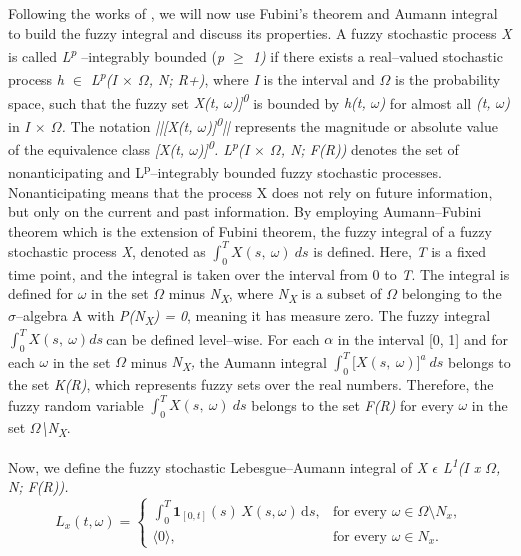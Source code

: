 \documentclass[12pt,a4paper]{report}
\numberwithin{equation}{section}
\begin{document}
Following the works of \cite{jafari2021fuzzy_81}, we will now use Fubini's theorem and
Aumann integral to build the fuzzy integral and discuss its properties.
A fuzzy stochastic process \emph{X} is called
\emph{L\textsuperscript{p}} --integrably bounded (\emph{p $\geq$ 1)} if there
exists a real--valued stochastic process \emph{h $\in$ L\textsuperscript{p}(I
$\times$ $\Omega$, N; R+)}, where \emph{I} is the interval and \emph{$\Omega$} is the
probability space, such that the fuzzy set \emph{\textbar\textbar{[}X(t,
$\omega$){]}\textsuperscript{0}}\textbar\textbar{} is bounded by \emph{h(t, $\omega$)}
for almost all \emph{(t, $\omega$)} in \emph{I $\times$ $\Omega$.} The notation
\emph{||{[}X(t, $\omega$){]}\textsuperscript{0}||} represents the magnitude or
absolute value of the equivalence class \emph{{[}X(t,
$\omega$){]}\textsuperscript{0}. L\textsuperscript{p}(I $\times$ $\Omega$, N; F(R))} denotes
the set of nonanticipating and L\textsuperscript{p}--integrably bounded
fuzzy stochastic processes. Nonanticipating means that the process X
does not rely on future information, but only on the current and past
information. By employing Aumann--Fubini theorem which is the extension
of Fubini theorem, the fuzzy integral of a fuzzy stochastic process
\emph{X}, denoted as \(\int_{0}^{T}{X(s,\ \omega)\ ds}\) is defined.
Here, \emph{T} is a fixed time point, and the integral is taken over the
interval from 0 to \emph{T}. The integral is defined for \emph{$\omega$} in the
set \emph{$\Omega$} minus \emph{N\textsubscript{X}}, where
\emph{N\textsubscript{X}} is a subset of \emph{$\Omega$} belonging to the
$\sigma$--algebra A with \emph{P(N\textsubscript{X}) = 0}, meaning it has
measure zero. The fuzzy integral \(\int_{0}^{T}{X(s,\ \omega)ds\ }\)can
be defined level--wise. For each \emph{$\alpha$} in the interval {[}0, 1{]} and
for each $\omega$ in the set \emph{$\Omega$} minus \emph{N\textsubscript{X},} the
Aumann integral \(\int_{0}^{T}{\lbrack X(s,\ \omega)\rbrack^{a}\ ds}\)
belongs to the set \emph{K(R)}, which represents fuzzy sets over the
real numbers. Therefore, the fuzzy random variable
\(\int_{0}^{T}{X(s,\ \omega)\ ds}\) belongs to the set \emph{F(R)} for
every \emph{$\omega$} in the set \emph{$\Omega$\textbackslash N\textsubscript{X}}.

Now, we define the fuzzy stochastic Lebesgue--Aumann integral of \emph{X
$\epsilon$ L\textsuperscript{1}(I x $\Omega$, N; F(R)).}
\begin{equation}\tag{5.1.5}\label{eq:5.1.5}
L_{x}(t,\omega)=
\begin{cases}
\displaystyle \int_{0}^{T}\mathbf{1}_{[0,t]}(s)\,X(s,\omega)\,\mathrm{d}s,
& \text{for every }\omega\in\Omega\setminus N_x,\\[6pt]
\langle 0\rangle, & \text{for every }\omega\in N_x.
\end{cases}
\end{equation}
\end{document}
